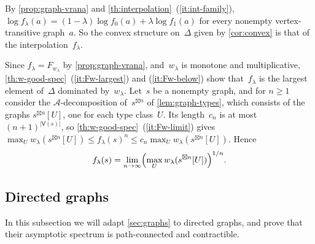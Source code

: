 \documentclass[11pt,letterpaper]{article}
\begin{document}
By \cref{prop:graph-vrana} and \cref{th:interpolation}~(\ref{it:int-family}), $\log f_\lambda(a) = (1-\lambda)\log f_0(a) + \lambda\log f_1(a)$ for every nonempty vertex-transitive graph~$a$. So the convex structure on~$\Delta$ given by \cref{cor:convex} is that of the interpolation~$f_\lambda$.

Since $f_\lambda = F_{w_\lambda}$ by \cref{prop:graph-vrana}, and~$w_\lambda$ is monotone and multiplicative, \cref{th:w-good-spec}~(\ref{it:Fw-largest}) and (\ref{it:Fw-below}) show that~$f_\lambda$ is the largest element of~$\Delta$ dominated by~$w_\lambda$. Let~$s$ be a nonempty graph, and for $n \geq 1$ consider the $\mathcal{A}$-decomposition of~$s^{\boxtimes n}$ of \cref{lem:graph-types}, which consists of the graphs $s^{\boxtimes n}[U]$, one for each type class~$U$. Its length~$c_n$ is at most $(n+1)^{|\mathsf{V}(s)|}$, so \cref{th:w-good-spec}~(\ref{it:Fw-limit}) gives $\max_U w_\lambda(s^{\boxtimes n}[U]) \leq f_\lambda(s)^n \leq c_n \max_U w_\lambda(s^{\boxtimes n}[U])$. Hence
\[
f_\lambda(s) = \lim_{n \to \infty} \Bigl( \max_U w_\lambda(s^{\boxtimes n}[U]) \Bigr)^{1/n}.
\]

\subsection{Directed graphs}\label{sec:digraphs}

In this subsection we will adapt \cref{sec:graphs} to directed graphs, and prove that their asymptotic spectrum is path-connected and contractible. 
\end{document}
